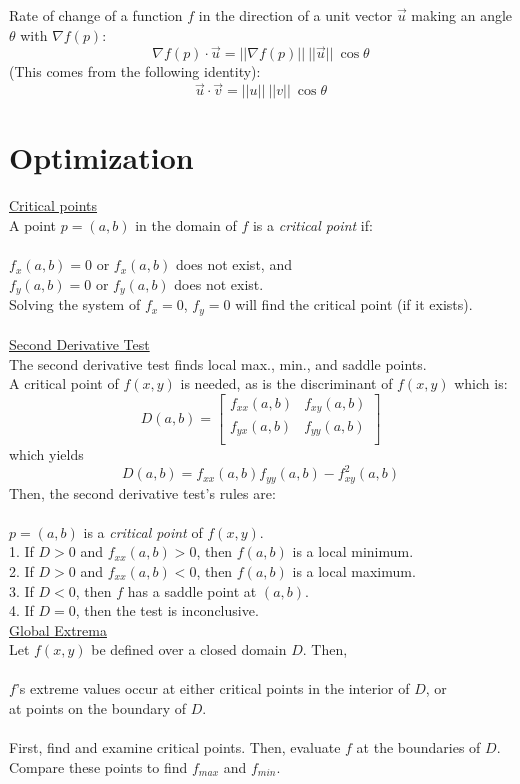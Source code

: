 \documentclass[12pt]{article}
\begin{document}
Rate of change of a function $f$ in the direction of a unit vector $\vec{u}$ making an angle $\theta$ with $\nabla f(p)$:\\
$$
\nabla f(p) \cdot \vec{u} = ||\nabla f(p)|| \ ||\vec{u}|| \ \cos \theta
$$
(This comes from the following identity):
$$
\vec{u} \cdot \vec{v} = ||u|| \ ||v|| \ \cos \theta
$$

\section*{Optimization}
\underline{Critical points}\\
A point $p = (a,b)$ in the domain of $f$ is a \emph{critical point} if:\\\\
$f_x(a,b) = 0$ or $f_x(a,b)$ does not exist, and\\
$f_y(a,b) = 0$ or $f_y(a,b)$ does not exist.\\

Solving the system of $f_x = 0$, $f_y = 0$ will find the critical point (if it exists).\\\\

\underline{Second Derivative Test}\\
The second derivative test finds local max., min., and saddle points.\\
A critical point of $f(x,y)$ is needed, as is the discriminant of $f(x,y)$ which is:
$$
D(a,b) = \begin{bmatrix}
 f_{xx}(a,b) & f_{xy}(a,b)\\
  f_{yx}(a,b) & f_{yy}(a,b)\\
\end{bmatrix}
$$
which yields
$$
D(a,b) = f_{xx}(a,b) f_{yy}(a,b) - f_{xy}^2(a,b)
$$
Then, the second derivative test's rules are:\\\\
 $p = (a,b)$ is a \emph{critical point} of $f(x,y)$.\\
1. If $D > 0$ and $f_{xx}(a,b) > 0$, then $f(a,b)$ is a local minimum.\\
2. If $D > 0$ and $f_{xx}(a,b) < 0$, then $f(a,b)$ is a local maximum.\\
3. If $D < 0$, then $f$ has a saddle point at $(a,b)$.\\
4. If $D = 0$, then the test is inconclusive.\\

\underline{Global Extrema}\\
Let $f(x,y)$ be defined over a closed domain $D$. Then,\\\\
$f$'s extreme values occur at either critical points in the interior of $D$, or\\
at points on the boundary of $D$.\\\\
First, find and examine critical points. Then, evaluate $f$ at the boundaries of $D$.\\
Compare these points to find $f_{max}$ and $f_{min}$.\\
\end{document}
